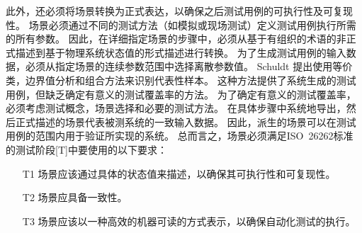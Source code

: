 此外，还必须将场景转换为正式表达，以确保之后测试用例的可执行性及可复现性。
场景必须通过不同的测试方法（如模拟或现场测试）定义测试用例执行所需的所有参数。
因此，在详细指定场景的步骤中，必须从基于有组织的术语的非正式描述到基于物理系统状态值的形式描述进行转换。
为了生成测试用例的输入数据，必须从指定场景的连续参数范围中选择离散参数值。
Schuldt \cite{Schuldt2017}提出使用等价类，边界值分析和组合方法来识别代表性样本。
这种方法提供了系统生成的测试用例，但缺乏确定有意义的测试覆盖率的方法。
为了确定有意义的测试覆盖率，必须考虑测试概念，场景选择和必要的测试方法。
在具体步骤中系统地导出，然后正式描述的场景代表被测系统的一致输入数据。
因此，派生的场景可以在测试用例的范围内用于验证所实现的系统。
总而言之，场景必须满足ISO~26262标准的测试阶段[T]中要使用的以下要求：

\begin{itemize}
	\item[T1] 场景应该通过具体的状态值来描述，以确保其可执行性和可复现性。
	\item[T2] 场景应具备一致性。
	\item[T3] 场景应该以一种高效的机器可读的方式表示，以确保自动化测试的执行。
\end{itemize}

